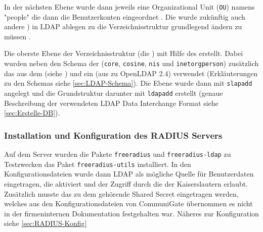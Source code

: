 \documentclass[11pt,a4paper,titlepage=firstiscover]{scrartcl} %
\begin{document}
In der nächsten Ebene wurde dann jeweils eine Organizational Unit (\texttt{OU}) 
namens "people"  die dann die Benutzerkonten eingeordnet 
. Die  wurde   zukünftig auch andere ) in LDAP ablegen 
zu  die Verzeichnisstruktur grundlegend ändern zu müssen 
.

Die oberste Ebene der Verzeichnisstruktur (die )
 mit Hilfe des  erstellt. Dabei 
wurden neben den  Schema der  (\texttt{core}, \texttt{cosine}, 
\texttt{nis} und \texttt{inetorgperson}) zusätzlich das 
 aus dem  (siehe 
) und ein  (aus  zu OpenLDAP 2.4) 
verwendet (Erkläuterungen zu den Schemas  
siehe \autoref{sec:LDAP-Schema}). Die  Ebene wurde dann mit 
\texttt{slapadd} angelegt und die Grundstruktur darunter mit \texttt{ldapadd} 
erstellt (genaue Beschreibung der verwendeten LDAP Data Interchange Format 
 siehe \autoref{sec:Erstelle-DB}).

\subsubsection{Installation und Konfiguration des RADIUS Servers}\label{sec:RADIUS-Konf}
Auf dem Server wurden die Pakete \texttt{freeradius} und \texttt{freeradius-ldap} 
 zu Testzwecken \tcr{-} das Paket 
\texttt{freeradius-utils} installiert. In den Konfigurationsdateien wurde dann 
LDAP als mögliche Quelle für Benutzerdaten eingetragen, die  
aktiviert und der Zugriff durch die  der  
Kaiserslautern erlaubt. Zusätzlich musste das zu dem  
gehörende Shared Secret eingetragen werden, welches aus den 
Konfigurationsdateien von CommuniGate übernommen  es nicht in 
der firmeninternen Dokumentation festgehalten war. Näheres zur Konfiguration 
siehe \autoref{sec:RADIUS-Konfig}
\end{document}
